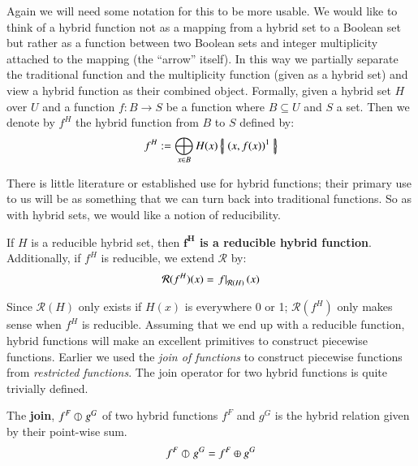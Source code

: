 Again we will need some notation for this to be more usable.
We would like to think of a hybrid function not as a mapping from a hybrid set to a Boolean set but rather as
a function between two Boolean sets and integer multiplicity attached to the mapping (the ``arrow'' itself).
In this way we partially separate the traditional function and the multiplicity function (given as a hybrid set) and view a
hybrid function as their combined object.
Formally, given a hybrid set $H$ over $U$ and a function $f:B \to S$ be a function where $B \subseteq U$ and $S$ a set.
Then we denote by $f^H$ the hybrid function from $B$ to $S$ defined by:
\begin{equation}
	\label{eqn:hfunc}
	f^H := \bigoplus_{x \in B} H(x) \left\{ \! \left| \;  (x, f(x) )^1  \; \right| \! \right\}
\end{equation}


There is little literature or established use for hybrid functions;
their primary use to us will be as something that we can turn back into traditional functions.
So as with hybrid sets, we would like a notion of reducibility.


\begin{definition}
	If $H$ is a reducible hybrid set, then \textbf{$\boldsymbol{f^H}$ is a reducible hybrid function}. 
	Additionally, if $f^H$ is reducible, we extend $\mathcal{R}$ by:
	\begin{equation}
		\mathcal{R}(f^H)(x) = \left.f\right|_{\mathcal{R}(H)}(x)
	\end{equation}
\end{definition}


Since $\mathcal{R}(H)$ only exists if $H(x)$ is everywhere 0 or 1; 
$\mathcal{R}(f^H)$ only makes sense when $f^H$ is reducible.
Assuming that we end up with a reducible function, 
hybrid functions will make an excellent primitives to construct piecewise functions.
Earlier we used the \emph{join of functions} to construct piecewise functions from \emph{restricted functions}.
The join operator for two hybrid functions is quite trivially defined.

 
\begin{definition}
	The \textbf{join}, $f^F \varobar^{} g^G$ of two hybrid functions $f^F$ and $g^G$ is 
	the hybrid relation given by their point-wise sum.
	\begin{equation} \label{def:hjoin}
		f^F \varobar^{} g^G = f^F \oplus g^G
	\end{equation}
\end{definition}


